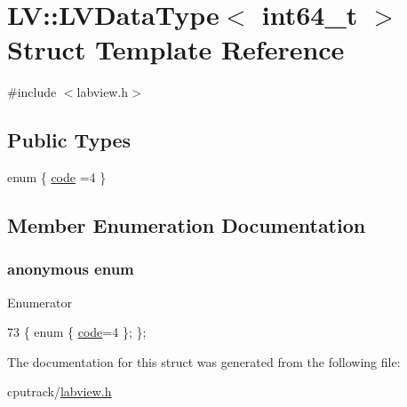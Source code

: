 \hypertarget{struct_l_v_1_1_l_v_data_type_3_01int64__t_01_4}{}\section{LV\+:\+:L\+V\+Data\+Type$<$ int64\+\_\+t $>$ Struct Template Reference}
\label{struct_l_v_1_1_l_v_data_type_3_01int64__t_01_4}


{\ttfamily \#include $<$labview.\+h$>$}

\subsection*{Public Types}
\begin{DoxyCompactItemize}
\item 
enum \{ \hyperlink{struct_l_v_1_1_l_v_data_type_3_01int64__t_01_4_a86f5da221b0ab9dc26b3a08f70cb9c54aee1d54e0634f46e39ec444da51088219}{code} =4
 \}
\end{DoxyCompactItemize}


\subsection{Member Enumeration Documentation}
\subsubsection[{\texorpdfstring{anonymous enum}{anonymous enum}}]{\setlength{\rightskip}{0pt plus 5cm}anonymous enum}\hypertarget{struct_l_v_1_1_l_v_data_type_3_01int64__t_01_4_a86f5da221b0ab9dc26b3a08f70cb9c54}{}\label{struct_l_v_1_1_l_v_data_type_3_01int64__t_01_4_a86f5da221b0ab9dc26b3a08f70cb9c54}
\begin{Desc}
\item[Enumerator]\par
\begin{description}
\item[{\em 
code\hypertarget{struct_l_v_1_1_l_v_data_type_3_01int64__t_01_4_a86f5da221b0ab9dc26b3a08f70cb9c54aee1d54e0634f46e39ec444da51088219}{}\label{struct_l_v_1_1_l_v_data_type_3_01int64__t_01_4_a86f5da221b0ab9dc26b3a08f70cb9c54aee1d54e0634f46e39ec444da51088219}
}]\end{description}
\end{Desc}

\begin{DoxyCode}
73 \{ \textcolor{keyword}{enum} \{ \hyperlink{struct_l_v_1_1_l_v_data_type_3_01int64__t_01_4_a86f5da221b0ab9dc26b3a08f70cb9c54aee1d54e0634f46e39ec444da51088219}{code}=4 \}; \};
\end{DoxyCode}


The documentation for this struct was generated from the following file\+:\begin{DoxyCompactItemize}
\item 
cputrack/\hyperlink{labview_8h}{labview.\+h}\end{DoxyCompactItemize}
